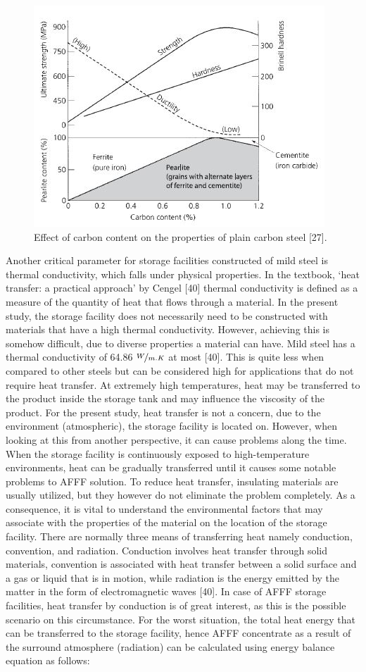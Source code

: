 \documentclass[12pt]{report}
\begin{document}
\begin{figure}[H]
    \centering
    \includegraphics[width=.65\textwidth]{effect_of_carbon_content.jpg}
    \caption{Effect of carbon content on the properties of plain carbon steel [27].}
    \label{ch3:figure:carbon}
\end{figure}

Another critical parameter for storage facilities constructed of mild steel is thermal conductivity, which falls under physical properties. In the textbook, ‘heat transfer: a practical approach’ by Cengel [40] thermal conductivity is defined as a measure of the quantity of heat that flows through a material. In the present study, the storage facility does not necessarily need to be constructed with materials that have a high thermal conductivity. However, achieving this is somehow difficult, due to diverse properties a material can have.
Mild steel has a thermal conductivity of 64.86 $\nicefrac{W}{m.K}$ at most [40]. This is quite less when compared to other steels but can be considered high for applications that do not require heat transfer. At extremely high temperatures, heat may be transferred to the product inside the storage tank and may influence the viscosity of the product. For the present study, heat transfer is not a concern, due to the environment (atmospheric), the storage facility is located on. However, when looking at this from another perspective, it can cause problems along the time. When the storage facility is continuously exposed to high-temperature environments, heat can be gradually transferred until it causes some notable problems to AFFF solution. To reduce heat transfer, insulating materials are usually utilized, but they however do not eliminate the problem completely. As a consequence, it is vital to understand the environmental factors that may associate with the properties of the material on the location of the storage facility.
There are normally three means of transferring heat namely conduction, convention, and radiation. Conduction involves heat transfer through solid materials, convention is associated with heat transfer between a solid surface and a gas or liquid that is in motion, while radiation is the energy emitted by the matter in the form of electromagnetic waves [40]. In case of AFFF storage facilities, heat transfer by conduction is of great interest, as this is the possible scenario on this circumstance.   
For the worst situation, the total heat energy that can be transferred to the storage facility, hence AFFF concentrate as a result of the surround atmosphere (radiation) can be calculated using energy balance equation as follows:
\end{document}
